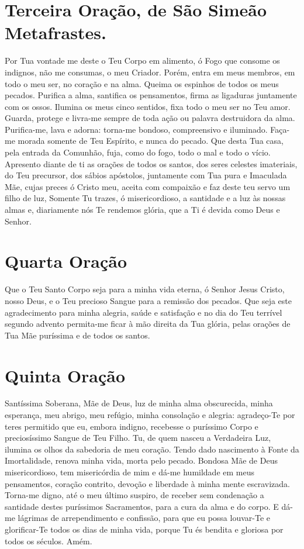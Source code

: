 \documentclass{subfiles}
\begin{document}
\section*{Terceira Oração, de São Simeão Metafrastes.}

Por Tua vontade me deste o Teu Corpo em alimento, ó Fogo que
consome os indignos, não me consumas, o meu Criador. Porém, entra em
meus membros, em todo o meu ser, no coração e na alma. Queima os espinhos
de todos os meus pecados. Purifica a alma, santifica os pensamentos, firma as
ligaduras juntamente com os ossos. Ilumina os meus cinco sentidos, fixa todo
o meu ser no Teu amor. Guarda, protege e livra-me sempre de toda ação ou
palavra destruidora da alma. Purifica-me, lava e adorna: torna-me bondoso,
compreensivo e iluminado. Faça-me morada somente de Teu Espírito, e nunca
do pecado. Que desta Tua casa, pela entrada da Comunhão, fuja, como do
fogo, todo o mal e todo o vício. Apresento diante de ti as orações de todos os
santos, dos seres celestes imateriais, do Teu precursor, dos sábios apóstolos,
juntamente com Tua pura e Imaculada Mãe, cujas preces ó Cristo meu, aceita
com compaixão e faz deste teu servo um filho de luz, Somente Tu trazes, ó
misericordioso, a santidade e a luz às nossas almas e, diariamente nós Te
rendemos glória, que a Ti é devida como Deus e Senhor.

\section*{Quarta Oração}

Que o Teu Santo Corpo seja para a minha vida eterna, ó Senhor Jesus
Cristo, nosso Deus, e o Teu precioso Sangue para a remissão dos pecados. Que
seja este agradecimento para minha alegria, saúde e satisfação e no dia do Teu
terrível segundo advento permita-me ficar à mão direita da Tua glória, pelas
orações de Tua Mãe puríssima e de todos os santos.

\section*{Quinta Oração}

Santíssima Soberana, Mãe de Deus, luz de minha alma obscurecida,
minha esperança, meu abrigo, meu refúgio, minha consolação e alegria:
agradeço-Te por teres permitido que eu, embora indigno, recebesse o
puríssimo Corpo e preciosíssimo Sangue de Teu Filho. Tu, de quem nasceu a
Verdadeira Luz, ilumina os olhos da sabedoria de meu coração. Tendo dado
nascimento à Fonte da Imortalidade, renova minha vida, morta pelo pecado.
Bondosa Mãe de Deus misericordioso, tem misericórdia de mim e dá-me
humildade em meus pensamentos, coração contrito, devoção e liberdade à
minha mente escravizada. Torna-me digno, até o meu último suspiro, de
receber sem condenação a santidade destes puríssimos Sacramentos, para a
cura da alma e do corpo. E dá-me lágrimas de arrependimento e confissão,
para que eu possa louvar-Te e glorificar-Te todos os dias de minha vida, porque
Tu és bendita e gloriosa por todos os séculos. Amém.
\end{document}
